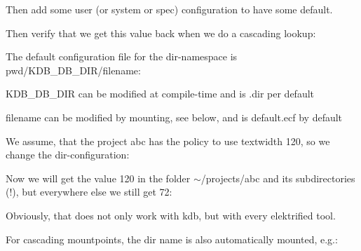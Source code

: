 Then add some user (or system or spec) configuration to have some default.


\begin{DoxyCode}{0}
\end{DoxyCode}


Then verify that we get this value back when we do a cascading lookup\+:


\begin{DoxyCode}{0}
\end{DoxyCode}


The default configuration file for the dir-\/namespace is {\ttfamily pwd}/\+K\+D\+B\+\_\+\+D\+B\+\_\+\+D\+I\+R/filename\+:


\begin{DoxyCode}{0}
\end{DoxyCode}



\begin{DoxyItemize}
\item K\+D\+B\+\_\+\+D\+B\+\_\+\+D\+IR can be modified at compile-\/time and is {\ttfamily .dir} per default
\item filename can be modified by mounting, see below, and is {\ttfamily default.\+ecf} by default
\end{DoxyItemize}

We assume, that the project abc has the policy to use textwidth 120, so we change the dir-\/configuration\+:


\begin{DoxyCode}{0}
\end{DoxyCode}


Now we will get the value 120 in the folder $\sim$/projects/abc and its subdirectories (!), but everywhere else we still get 72\+:


\begin{DoxyCode}{0}
\end{DoxyCode}


Obviously, that does not only work with kdb, but with every elektrified tool.

For cascading mountpoints, the dir name is also automatically mounted, e.\+g.\+:


\begin{DoxyCode}{0}
\end{DoxyCode}


